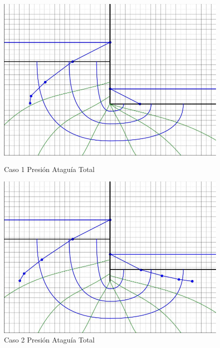 \begin{figure}[H]
    \centering
    \begin{minipage}{0.32\textwidth}
        \centering
        \includegraphics[width=\textwidth]{GRAFICOS/caso_1_presion_ataguia_total.jpg}
        \caption{Caso 1 Presión Ataguía Total}
        \label{fig:caso_1_presion_ataguia_total}
    \end{minipage}
    \begin{minipage}{0.32\textwidth}
        \centering
        \includegraphics[width=\textwidth]{GRAFICOS/caso_2_presion_ataguia_total.jpg}
        \caption{Caso 2 Presión Ataguía Total}
        \label{fig:caso_2_presion_ataguia_total}
    \end{minipage}
    \begin{minipage}{0.32\textwidth}

\end{minipage}
\end{figure}
